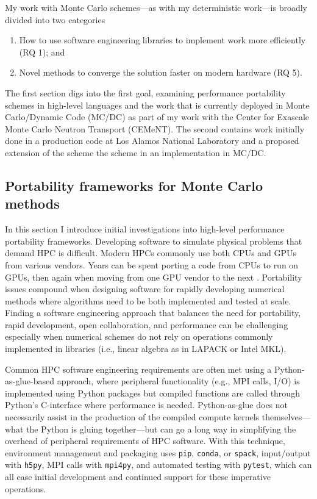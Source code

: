 My work with Monte Carlo schemes---as with my deterministic work---is broadly divided into two categories
\begin{enumerate}
    \item How to use software engineering libraries to implement work more efficiently (RQ 1); and
    \item Novel methods to converge the solution faster on modern hardware (RQ 5).
\end{enumerate}
The first section digs into the first goal, examining performance portability schemes in high-level languages and the work that is currently deployed in Monte Carlo/Dynamic Code (MC/DC) as part of my work with the Center for Exascale Monte Carlo Neutron Transport (CEMeNT).
The second contains work initially done in a production code at Los Alamos National Laboratory and a proposed extension of the scheme the scheme in an implementation in MC/DC.

\subsection{Portability frameworks for Monte Carlo methods}

In this section I introduce initial investigations into high-level performance portability frameworks.
Developing software to simulate physical problems that demand HPC is difficult.
Modern HPCs commonly use both CPUs and GPUs from various vendors.
Years can be spent porting a code from CPUs to run on GPUs, then again when moving from one GPU vendor to the next \cite{pozulp_progress_2023}.
Portability issues compound when designing software for rapidly developing numerical methods where algorithms need to be both implemented and tested at scale.
Finding a software engineering approach that balances the need for portability, rapid development, open collaboration, and performance can be challenging especially when numerical schemes do not rely on operations commonly implemented in libraries   (i.e., linear algebra as in LAPACK or Intel MKL). 

Common HPC software engineering requirements are often met using a Python-as-glue-based approach, where peripheral functionality (e.g., MPI calls, I/O) is implemented using Python packages but compiled functions are called through Python's C-interface where performance is needed.
Python-as-glue does not necessarily assist in the production of the compiled compute kernels themselves---what the Python is gluing together---but can go a long way in simplifying the overhead of peripheral requirements of HPC software.
With this technique, environment management and packaging uses \texttt{pip}, \texttt{conda}, or \texttt{spack}, input/output with \texttt{h5py}, MPI calls with \texttt{mpi4py}, 
and automated testing with \texttt{pytest}, which can all ease initial development and continued support for these imperative operations. 

